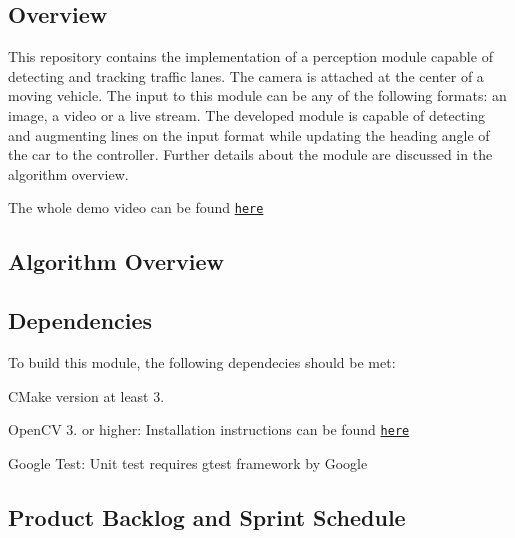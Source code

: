 \href{https://travis-ci.org/saimouli/Lane-Detection-Perception-Module}{\tt } \href{https://coveralls.io/github/saimouli/Lane-Detection-Perception-Module?branch=master}{\tt } \subsection*{\href{https://opensource.org/licenses/MIT}{\tt } }

\subsection*{Overview}

This repository contains the implementation of a perception module capable of detecting and tracking traffic lanes. The camera is attached at the center of a moving vehicle. The input to this module can be any of the following formats\+: an image, a video or a live stream. The developed module is capable of detecting and augmenting lines on the input format while updating the heading angle of the car to the controller. Further details about the module are discussed in the algorithm overview.

 

The whole demo video can be found \href{https://www.youtube.com/watch?v=-Mf2Tt2DLRo&feature=youtu.be}{\tt here}

\subsection*{Algorithm Overview}

 

 

\subsection*{Dependencies}

To build this module, the following dependecies should be met\+:


\begin{DoxyItemize}
\item C\+Make version at least 3.
\item Open\+CV 3. or higher\+: Installation instructions can be found \href{https://www.learnopencv.com/install-opencv3-on-ubuntu/}{\tt here}
\item Google Test\+: Unit test requires gtest framework by Google
\end{DoxyItemize}

\subsection*{Product Backlog and Sprint Schedule}

